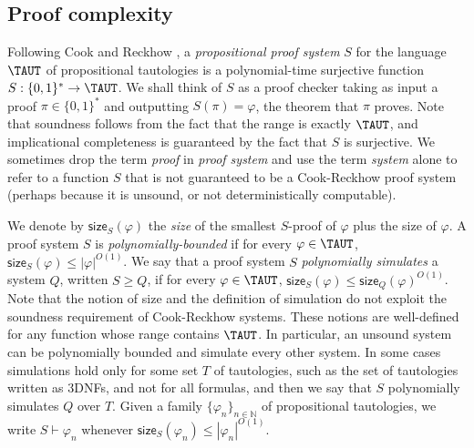 \documentclass[11pt]{article}
\theoremstyle{definition}
\theoremstyle{plain}
\theoremstyle{remark}
\newcommand{\size}[2]{\mathsf{size}_{#1}(#2)}
\begin{document}
\subsection{Proof complexity}
\label{subsec:proof-complexity}
Following Cook and Reckhow \cite{cookReckhow}, a \emph{propositional proof system} $S$ for the language $\TAUT$ of propositional tautologies is a polynomial-time surjective function $S : \{0,1\}^* \to \TAUT$. We shall think of $S$ as a proof checker taking as input a proof $\pi\in \{0 ,1\}^*$ and outputting $S(\pi) = \varphi$, the theorem that $\pi$ proves. Note that soundness follows from the fact that the range is exactly $\TAUT$, and implicational completeness is guaranteed by the fact that $S$ is surjective. We sometimes drop the term \emph{proof} in \emph{proof system} and use the term \emph{system} alone to refer to a function $S$ that is not guaranteed to be a Cook-Reckhow proof system (perhaps because it is unsound, or not deterministically computable).

We denote by $\size{S}{\varphi}$ the \emph{size} of the smallest $S$-proof of $\varphi$ plus the size of $\varphi$. A proof system $S$ is \emph{polynomially-bounded} if for every $\varphi \in \TAUT$, $\size{S}{\varphi} \leq |\varphi|^{O(1)}$. We say that a proof system $S$ \emph{polynomially simulates} a system $Q$, written $S \geq Q$, if for every $\varphi \in \TAUT$, $\size{S}{\varphi} \leq \size{Q}{\varphi}^{O(1)}$. Note that the notion of size and the definition of simulation do not exploit the soundness requirement of Cook-Reckhow systems. These notions are well-defined for any function whose range contains $\TAUT$. In particular, an unsound system can be polynomially bounded and simulate every other system. In some cases simulations hold only for some set $T$ of tautologies, such as the set of tautologies written as 3DNFs, and not for all formulas, and then we say that $S$ polynomially simulates $Q$ over $T$. Given a family $\{ \varphi_n\}_{n\in\mathbb{N}}$ of propositional tautologies, we write $S \vdash \varphi_n$ whenever $\size{S}{\varphi_n} \leq |\varphi_n|^{O(1)}$.
\end{document}
